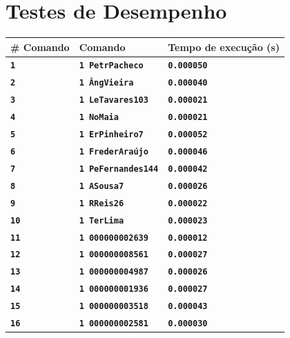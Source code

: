 \documentclass[12pt,a4paper]{report}
\begin{document}
\chapter{Testes de Desempenho}


\begin{tabularx}{\textwidth} { 
  | >{\centering\arraybackslash}X 
  | >{\centering\arraybackslash}X 
  | >{\centering\arraybackslash}X | }
 \hline
 \textbf{\# Comando} & \textbf{Comando} & \textbf{Tempo de execução (s)} \\
 \hline
 \texttt{\textbf{1}} & \texttt{\textbf{1 PetrPacheco}} & \texttt{\textbf{0.000050}}  \\
 \hline
 \texttt{\textbf{2}} & \texttt{\textbf{1 ÂngVieira}} & \texttt{\textbf{0.000040}}  \\
 \hline
 \texttt{\textbf{3}} & \texttt{\textbf{1 LeTavares103}} & \texttt{\textbf{0.000021}}  \\
 \hline
 \texttt{\textbf{4}} & \texttt{\textbf{1 NoMaia}} & \texttt{\textbf{0.000021}}  \\
 \hline
 \texttt{\textbf{5}} & \texttt{\textbf{1 ErPinheiro7}} & \texttt{\textbf{0.000052}}  \\
 \hline
 \texttt{\textbf{6}} & \texttt{\textbf{1 FrederAraújo}} & \texttt{\textbf{0.000046}}  \\
 \hline
 \texttt{\textbf{7}} & \texttt{\textbf{1 PeFernandes144}} & \texttt{\textbf{0.000042}}  \\
 \hline
 \texttt{\textbf{8}} & \texttt{\textbf{1 ASousa7}} & \texttt{\textbf{0.000026}}  \\
 \hline
 \texttt{\textbf{9}} & \texttt{\textbf{1 RReis26}} & \texttt{\textbf{0.000022}}  \\
 \hline
 \texttt{\textbf{10}} & \texttt{\textbf{1 TerLima}} & \texttt{\textbf{0.000023}}  \\
 \hline
 \texttt{\textbf{11}} & \texttt{\textbf{1 000000002639}} & \texttt{\textbf{0.000012}}  \\
 \hline
 \texttt{\textbf{12}} & \texttt{\textbf{1 000000008561}} & \texttt{\textbf{0.000027}}  \\
 \hline
 \texttt{\textbf{13}} & \texttt{\textbf{1 000000004987}} & \texttt{\textbf{0.000026}}  \\
 \hline
 \texttt{\textbf{14}} & \texttt{\textbf{1 000000001936}} & \texttt{\textbf{0.000027}}  \\
 \hline
 \texttt{\textbf{15}} & \texttt{\textbf{1 000000003518}} & \texttt{\textbf{0.000043}}  \\
 \hline
 \texttt{\textbf{16}} & \texttt{\textbf{1 000000002581}} & \texttt{\textbf{0.000030}}  \\

\end{tabularx}
\end{document}
